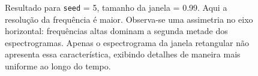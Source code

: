 \begin{figure}[ht!]
	\vspace{1mm}	
	\begin{center}
	\end{center}
	\vspace{1mm}	
	\caption{Resultado para \texttt{seed} = 5, tamanho da janela = 0.99. Aqui a resolução da frequência é maior. Observa-se uma assimetria no eixo horizontal: frequências altas dominam a segunda metade dos espectrogramas. Apenas o espectrograma da janela retangular não apresenta essa característica, exibindo detalhes de maneira mais uniforme ao longo do tempo.} 
	\label{fig:seed5_0.99}
\end{figure}

